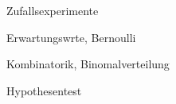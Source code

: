 


\begin{inhalt}
	\item Zufallsexperimente
	\item Erwartungswrte, Bernoulli
	\item Kombinatorik, Binomalverteilung
	\item Hypothesentest
\end{inhalt}




